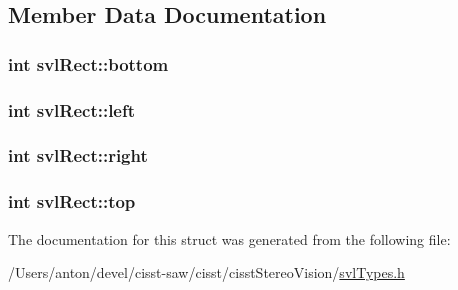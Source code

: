 \subsection{Member Data Documentation}
\hypertarget{structsvl_rect_abebdb3b96af5a98d7a952b6a441f7e89}{}
\subsubsection[{bottom}]{\setlength{\rightskip}{0pt plus 5cm}int svl\+Rect\+::bottom}\label{structsvl_rect_abebdb3b96af5a98d7a952b6a441f7e89}
\hypertarget{structsvl_rect_aee6c8420a1d44587061ddc2301ce7126}{}
\subsubsection[{left}]{\setlength{\rightskip}{0pt plus 5cm}int svl\+Rect\+::left}\label{structsvl_rect_aee6c8420a1d44587061ddc2301ce7126}
\hypertarget{structsvl_rect_a277323d99bd51d332973e9f4c94ef081}{}
\subsubsection[{right}]{\setlength{\rightskip}{0pt plus 5cm}int svl\+Rect\+::right}\label{structsvl_rect_a277323d99bd51d332973e9f4c94ef081}
\hypertarget{structsvl_rect_a66ceb775b0be45ce2d4229208e1bb210}{}
\subsubsection[{top}]{\setlength{\rightskip}{0pt plus 5cm}int svl\+Rect\+::top}\label{structsvl_rect_a66ceb775b0be45ce2d4229208e1bb210}


The documentation for this struct was generated from the following file\+:\begin{DoxyCompactItemize}
\item 
/\+Users/anton/devel/cisst-\/saw/cisst/cisst\+Stereo\+Vision/\hyperlink{svl_types_8h}{svl\+Types.\+h}\end{DoxyCompactItemize}
